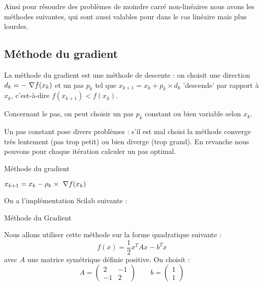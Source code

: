 		Ainsi pour résoudre des problèmes de moindre carré non-linéaires nous avons les méthodes suivantes, qui sont aussi valables pour dans le cas linéaire mais plus lourdes.


	\subsection{Méthode du gradient}


		La méthode du gradient est une méthode de descente : on choisit une direction $d_k = -~\nabla f(x_k)$ et un pas $p_k$ tel que $x_{k+1} = x_k + p_k\times d_k$ 'descende' par rapport à $x_k$, c'est-à-dire $f(x_{k+1})<f(x_k)$.

		Concernant le pas, on peut choisir un pas $p_k$ constant ou bien variable selon $x_k$.

		Un pas constant pose divers problèmes : s'il est mal choisi la méthode converge très lentement (pas trop petit) ou bien diverge (trop grand). En revanche nous pouvons pour chaque itération calculer un pas optimal.

		\begin{algorithm}[H]
		\DontPrintSemicolon
		\caption{Méthode du gradient}
			{
				$x_{k+1} = x_k - \rho_k \times ~\nabla f(x_k)$\;
			}
		\end{algorithm}
	


		On a l'implémentation Scilab suivante :
		\begin{listing}[H]
			\caption{Méthode du Gradient}
			\label{code-5-methGrad}
		\end{listing}

		Nous allons utiliser cette méthode sur la forme quadratique suivante :
		\begin{equation}
			\label{eq-5-formeQuad}
			f(x) = \frac{1}{2} x^T A x - b^T x
		\end{equation}
		avec $A$ une matrice symétrique définie positive. On choisit :
		$$
			A = \begin{pmatrix}
				2	&	-1	\\
				-1	&	2	
			\end{pmatrix}
			\qquad
			b = \begin{pmatrix}
				1	\\
				1
			\end{pmatrix}
		$$

